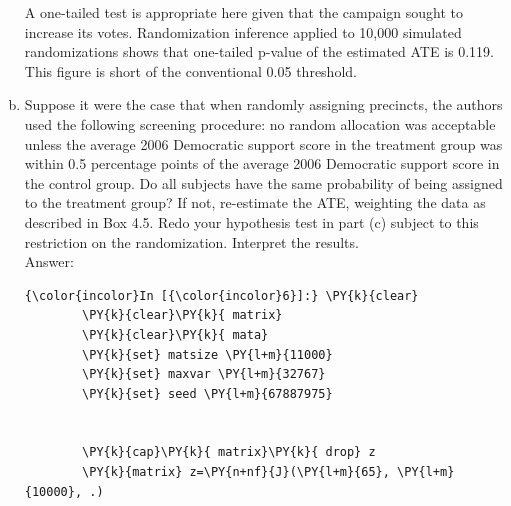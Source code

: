 \documentclass[11pt,notitlepage]{article}\usepackage[]{graphicx}\usepackage[]{color}
\makeatletter
\newenvironment{kframe}{%
 \def\at@end@of@kframe{}%
 \ifinner\ifhmode%
  \def\at@end@of@kframe{\end{minipage}}%
  \begin{minipage}{\columnwidth}%
 \fi\fi%
 \def\FrameCommand##1{\hskip\@totalleftmargin \hskip-\fboxsep
 \colorbox{shadecolor}{##1}\hskip-\fboxsep
     \hskip-\linewidth \hskip-\@totalleftmargin \hskip\columnwidth}%
 \MakeFramed {\advance\hsize-\width
   \@totalleftmargin\z@ \linewidth\hsize
   \@setminipage}}%
 {\par\unskip\endMakeFramed%
 \at@end@of@kframe}
\newenvironment{knitrout}{}{} %
\makeatother
\begin{document}
\begin{enumerate}[a)]
\begin{knitrout}
{}



\end{knitrout}

A one-tailed test is appropriate here given that the campaign sought to increase its votes.  Randomization inference applied to 10,000 simulated randomizations shows that one-tailed p-value of the estimated ATE is 0.119. This figure is short of the conventional 0.05 threshold.

\item Suppose it were the case that when randomly assigning precincts, the authors used the following screening procedure: no random allocation was acceptable unless the average 2006 Democratic support score in the treatment group was within 0.5 percentage points of the average 2006 Democratic support score in the control group. Do all subjects have the same probability of being assigned to the treatment group? If not, re-estimate the ATE, weighting the data as described in Box 4.5. Redo your hypothesis test in part (c) subject to this restriction on the randomization. Interpret the results.\\
Answer:\\

\begin{knitrout}
\color{fgcolor}\begin{kframe}
   \begin{Verbatim}[commandchars=\\\{\}]
{\color{incolor}In [{\color{incolor}6}]:} \PY{k}{clear}
        \PY{k}{clear}\PY{k}{ matrix}
        \PY{k}{clear}\PY{k}{ mata}
        \PY{k}{set} matsize \PY{l+m}{11000} 
        \PY{k}{set} maxvar \PY{l+m}{32767}
        \PY{k}{set} seed \PY{l+m}{67887975}
        
        
        \PY{k}{cap}\PY{k}{ matrix}\PY{k}{ drop} z
        \PY{k}{matrix} z=\PY{n+nf}{J}(\PY{l+m}{65}, \PY{l+m}{10000}, .)
\end{Verbatim}


\end{kframe}
\end{knitrout}
\end{enumerate}
\end{document}
